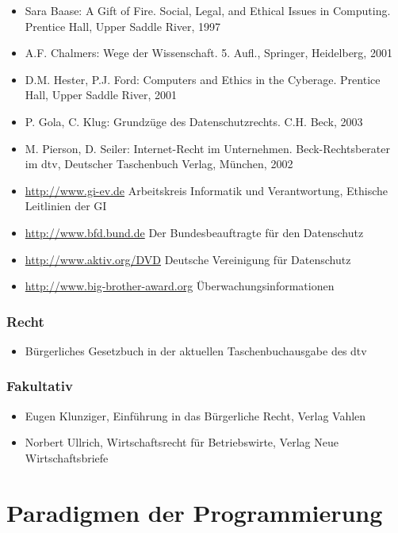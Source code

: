 \begin{itemize}
\item
  Sara Baase: A Gift of Fire. Social, Legal, and Ethical Issues in
  Computing. Prentice Hall, Upper Saddle River, 1997
\item
  A.F. Chalmers: Wege der Wissenschaft. 5. Aufl., Springer, Heidelberg,
  2001
\item
  D.M. Hester, P.J. Ford: Computers and Ethics in the Cyberage. Prentice
  Hall, Upper Saddle River, 2001
\item
  P. Gola, C. Klug: Grundzüge des Datenschutzrechts. C.H. Beck, 2003
\item
  M. Pierson, D. Seiler: Internet-Recht im Unternehmen.
  Beck-Rechtsberater im dtv, Deutscher Taschenbuch Verlag, München, 2002
\item
  \url{http://www.gi-ev.de} Arbeitskreis Informatik und Verantwortung,
  Ethische Leitlinien der GI
\item
  \url{http://www.bfd.bund.de} Der Bundesbeauftragte für den Datenschutz
\item
  \url{http://www.aktiv.org/DVD} Deutsche Vereinigung für Datenschutz
\item
  \url{http://www.big-brother-award.org} Überwachungsinformationen
\end{itemize}

\subsection*{Recht}\label{recht-2}

\begin{itemize}
\tightlist
\item
  Bürgerliches Gesetzbuch in der aktuellen Taschenbuchausgabe des dtv
\end{itemize}

\subsection*{Fakultativ}\label{fakultativ}

\begin{itemize}
\item
  Eugen Klunziger, Einführung in das Bürgerliche Recht, Verlag Vahlen
\item
  Norbert Ullrich, Wirtschaftsrecht für Betriebswirte, Verlag Neue
  Wirtschaftsbriefe
\end{itemize}

\chapter{Paradigmen der
Programmierung}\label{paradigmen-der-programmierung}

